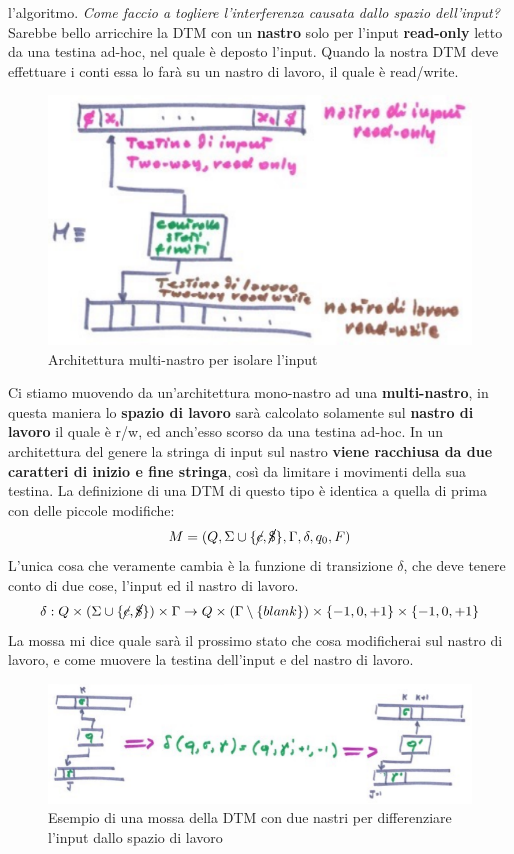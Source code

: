 \documentclass{article}
\begin{document}
l'algoritmo. \textit{Come faccio a togliere l'interferenza causata dallo spazio dell'input?}
Sarebbe bello arricchire la DTM con un \textbf{nastro} solo per l'input \textbf{read-only} letto
da una testina ad-hoc, nel quale è deposto l'input. Quando la nostra DTM deve effettuare i conti
essa lo farà su un nastro di lavoro, il quale è read/write.
\begin{figure}[H]
    \centering
    \includegraphics[scale=0.6]{images/nastri_sep_input.png}
    \caption{Architettura multi-nastro per isolare l'input}
\end{figure}
Ci stiamo muovendo da un'architettura mono-nastro ad una \textbf{multi-nastro}, in questa
maniera lo \textbf{spazio di lavoro} sarà calcolato solamente sul \textbf{nastro di lavoro} il quale è r/w,
ed anch'esso scorso da una testina ad-hoc. In
un architettura del genere la stringa di input sul nastro \textbf{viene racchiusa da due caratteri
di inizio e fine stringa}, così da limitare i movimenti della sua testina.
La definizione di una DTM di questo tipo è identica a quella di prima con delle piccole modifiche:
$$M=(Q,\Sigma\cup\{\cancel{c},\cancel{\$} \},\Gamma,\delta,q_0,F)$$
L'unica cosa che veramente cambia è la funzione di transizione $\delta$, che deve tenere
conto di due cose, l'input ed il nastro di lavoro.
$$\delta:Q\times(\Sigma\cup\{\cancel{c},\cancel{\$} \})\times\Gamma\rightarrow Q\times(\Gamma\setminus\{blank\})\times\{-1,0,+1\}\times \{-1,0,+1\}$$
La mossa mi dice quale sarà il prossimo stato che cosa modificherai sul nastro di lavoro, e
come muovere la testina dell'input e del nastro di lavoro.
\begin{figure}[H]
    \centering
    \includegraphics[scale=0.5]{images/DTM_input_transition.png}
    \caption{Esempio di una mossa della DTM con due nastri per differenziare l'input dallo spazio di lavoro}
\end{figure}
\end{document}
